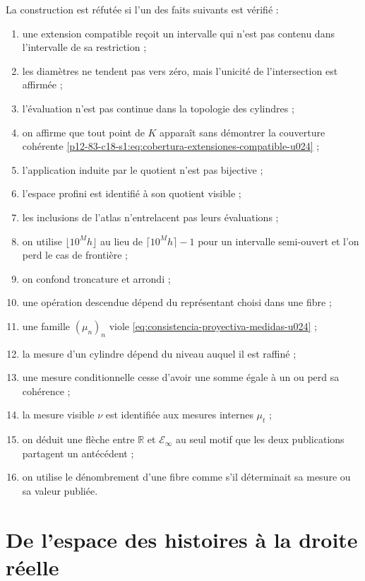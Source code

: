 \begin{criterion}
La construction est réfutée si l'un des faits
suivants est vérifié :
\begin{enumerate}
 \item une extension compatible reçoit un intervalle qui n'est pas contenu
       dans l'intervalle de sa restriction ;
 \item les diamètres ne tendent pas vers zéro, mais l'unicité de
       l'intersection est affirmée ;
 \item l'évaluation n'est pas continue dans la topologie des cylindres ;
 \item on affirme que tout point de \(K\) apparaît sans démontrer la couverture
       cohérente \eqref{p12-83-c18-s1:eq:cobertura-extensiones-compatible-u024} ;
 \item l'application induite par le quotient n'est pas bijective ;
 \item l'espace profini est identifié à son quotient visible ;
 \item les inclusions de l'atlas n'entrelacent pas leurs évaluations ;
 \item on utilise \(\lfloor10^Mh\rfloor\) au lieu de
       \(\lceil10^Mh\rceil-1\) pour un intervalle semi-ouvert et l'on perd
       le cas de frontière ;
 \item on confond troncature et arrondi ;
 \item une opération descendue dépend du représentant choisi dans une
       fibre ;
 \item une famille \((\mu_n)_n\) viole
       \eqref{eq:consistencia-proyectiva-medidas-u024} ;
 \item la mesure d'un cylindre dépend du niveau auquel il est raffiné ;
 \item une mesure conditionnelle cesse d'avoir une somme égale à un ou perd sa cohérence ;
 \item la mesure visible \(\nu\) est identifiée aux mesures internes
       \(\mu_t\) ;
 \item on déduit une flèche entre \(\mathbb R\) et
       \(\mathcal E_\infty\) au seul motif que les deux publications partagent
       un antécédent ;
 \item on utilise le dénombrement d'une fibre comme s'il déterminait sa mesure ou sa
       valeur publiée.
\end{enumerate}
\end{criterion}


\section{De l'espace des histoires à la droite réelle}

